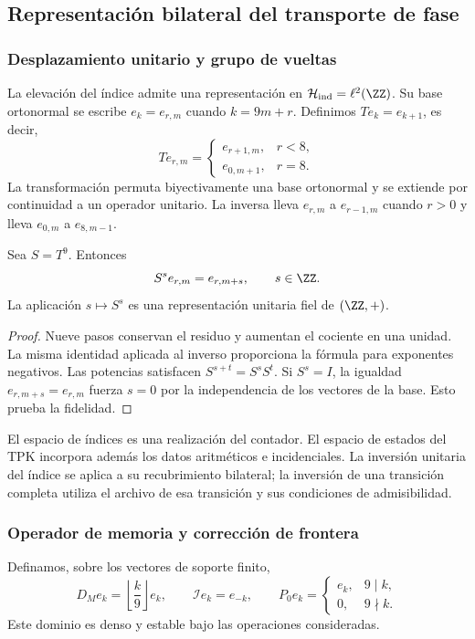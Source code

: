 \subsection{Representación bilateral del transporte de fase}

\subsubsection{Desplazamiento unitario y grupo de vueltas}

La elevación del índice admite una representación en
$\mathcal H_{\rm ind}=\ell^2(\ZZ)$. Su base ortonormal se escribe
$e_k=e_{r,m}$ cuando $k=9m+r$. Definimos $Te_k=e_{k+1}$, es decir,
\[
 Te_{r,m}=\begin{cases}
 e_{r+1,m},&r<8,\\e_{0,m+1},&r=8.
 \end{cases}
\]
La transformación permuta biyectivamente una base ortonormal y se
extiende por continuidad a un operador unitario. La inversa lleva
$e_{r,m}$ a $e_{r-1,m}$ cuando $r>0$ y lleva $e_{0,m}$ a
$e_{8,m-1}$.

\begin{teorema}
\label{thm:cal-representacion}
Sea $S=T^9$. Entonces
\[
 S^se_{r,m}=e_{r,m+s},\qquad s\in\ZZ.
\]
La aplicación $s\mapsto S^s$ es una representación unitaria fiel de
$(\ZZ,+)$.
\end{teorema}
\begin{proof}
Nueve pasos conservan el residuo y aumentan el cociente en una unidad.
La misma identidad aplicada al inverso proporciona la fórmula para
exponentes negativos. Las potencias satisfacen
$S^{s+t}=S^sS^t$. Si $S^s=I$, la igualdad
$e_{r,m+s}=e_{r,m}$ fuerza $s=0$ por la independencia de los vectores
de la base. Esto prueba la fidelidad.
\end{proof}

El espacio de índices es una realización del contador. El espacio de
estados del TPK incorpora además los datos aritméticos e incidenciales.
La inversión unitaria del índice se aplica a su recubrimiento bilateral;
la inversión de una transición completa utiliza el archivo de esa
transición y sus condiciones de admisibilidad.

\subsubsection{Operador de memoria y corrección de frontera}

Definamos, sobre los vectores de soporte finito,
\[
 D_Me_k=\left\lfloor\frac k9\right\rfloor e_k,
 \qquad \mathcal Ie_k=e_{-k},
 \qquad P_0e_k=\begin{cases}e_k,&9\mid k,\\0,&9\nmid k.\end{cases}
\]
Este dominio es denso y estable bajo las operaciones consideradas.

